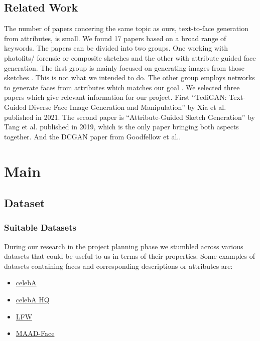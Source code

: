 \documentclass[12pt, a4paper]{article}
\begin{document}
\subsection{Related Work}
The number of papers concering the same topic as ours, text-to-face generation from attributes, is small. We found 17 papers based on a broad range of keywords. 
The papers can be divided into two groups. One working with photofits/ forensic or composite sketches and the other with attribute guided face generation.
The first group is mainly focused on generating images from those sketches \cite{6359918, LEI202013, SANNIDHAN2019452}. This is not what we intended to do. 
The other group employs networks to generate faces from attributes which matches our goal \cite{Xia_2021_CVPR,Lu_2018_ECCV,9117185,9320290,9412022,8462648,Gecer_2018_ECCV,8606936,9146375,Bodla_2018_ECCV,NIPS2016_b1301141,gauthier2014conditional,Xiao_2018_ECCV}.
We selected three papers which give relevant information for our project. First ``TediGAN: Text-Guided Diverse Face Image Generation and Manipulation'' by Xia 
et al. published in 2021\cite{Xia_2021_CVPR}. The second paper is ``Attribute-Guided Sketch Generation'' by Tang et al. published in 2019\cite{Tang}, which is 
the only paper bringing both aspects together. And the DCGAN paper from Goodfellow et al.\cite{dcgan}.

\section{Main}
\subsection{Dataset}
\subsubsection{Suitable Datasets}\label{SuitableDatasets}
During our research in the project planning phase we stumbled across various datasets that could be useful to us in
terms of their properties. Some examples of datasets containing faces and corresponding descriptions or attributes are:
\begin{itemize}
    \item \href{https://mmlab.ie.cuhk.edu.hk/projects/CelebA.html}{celebA}
    \item \href{http://mmlab.ie.cuhk.edu.hk/projects/CelebA/CelebAMask_HQ.html#:~:text=CelebAMask\%2DHQ\%20is\%20a\%20large,facial\%20attributes\%20corresponding\%20to\%20CelebA}{celebA HQ}
    \item \href{http://vis-www.cs.umass.edu/lfw/}{LFW}
    \item \href{https://github.com/pterhoer/MAAD-Face}{MAAD-Face}
\end{itemize}
\end{document}

